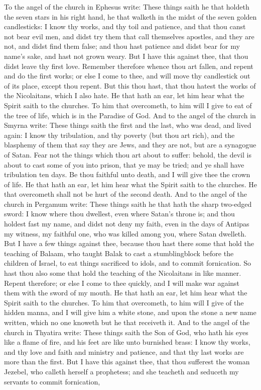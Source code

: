 To the angel of the church in Ephesus write: These things saith he that holdeth the seven stars in his right hand, he that walketh in the midst of the seven golden candlesticks: I know thy works, and thy toil and patience, and that thou canst not bear evil men, and didst try them that call themselves apostles, and they are not, and didst find them false; and thou hast patience and didst bear for my name’s sake, and hast not grown weary. But I have this against thee, that thou didst leave thy first love. Remember therefore whence thou art fallen, and repent and do the first works; or else I come to thee, and will move thy candlestick out of its place, except thou repent. But this thou hast, that thou hatest the works of the Nicolaitans, which I also hate. He that hath an ear, let him hear what the Spirit saith to the churches. To him that overcometh, to him will I give to eat of the tree of life, which is in the Paradise of God.  And to the angel of the church in Smyrna write: These things saith the first and the last, who was dead, and lived again: I know thy tribulation, and thy poverty (but thou art rich), and the blasphemy of them that say they are Jews, and they are not, but are a synagogue of Satan. Fear not the things which thou art about to suffer: behold, the devil is about to cast some of you into prison, that ye may be tried; and ye shall have tribulation ten days. Be thou faithful unto death, and I will give thee the crown of life. He that hath an ear, let him hear what the Spirit saith to the churches. He that overcometh shall not be hurt of the second death.  And to the angel of the church in Pergamum write: These things saith he that hath the sharp two-edged sword: I know where thou dwellest, even where Satan’s throne is; and thou holdest fast my name, and didst not deny my faith, even in the days of Antipas my witness, my faithful one, who was killed among you, where Satan dwelleth. But I have a few things against thee, because thou hast there some that hold the teaching of Balaam, who taught Balak to cast a stumblingblock before the children of Israel, to eat things sacrificed to idols, and to commit fornication. So hast thou also some that hold the teaching of the Nicolaitans in like manner. Repent therefore; or else I come to thee quickly, and I will make war against them with the sword of my mouth. He that hath an ear, let him hear what the Spirit saith to the churches. To him that overcometh, to him will I give of the hidden manna, and I will give him a white stone, and upon the stone a new name written, which no one knoweth but he that receiveth it.  And to the angel of the church in Thyatira write: These things saith the Son of God, who hath his eyes like a flame of fire, and his feet are like unto burnished brass: I know thy works, and thy love and faith and ministry and patience, and that thy last works are more than the first. But I have this against thee, that thou sufferest the woman Jezebel, who calleth herself a prophetess; and she teacheth and seduceth my servants to commit fornication, 